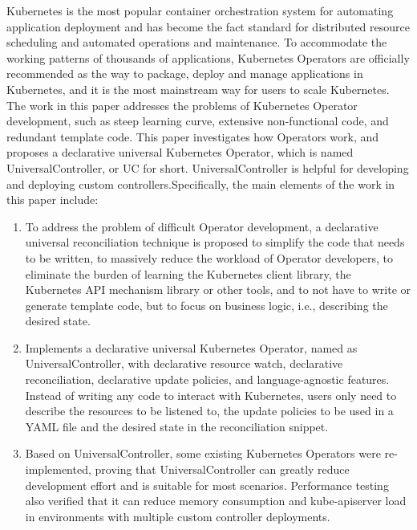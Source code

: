 \documentclass[macfonts,master]{njuthesis}
\begin{document}
\begin{englishabstract}
Kubernetes is the most popular container orchestration system for automating application deployment and has become the fact standard for distributed resource scheduling and automated operations and maintenance. To accommodate the working patterns of thousands of applications, Kubernetes Operators are officially recommended as the way to package, deploy and manage applications in Kubernetes, and it is the most mainstream way for users to scale Kubernetes. The work in this paper addresses the problems of Kubernetes Operator development, such as steep learning curve, extensive non-functional code, and redundant template code. This paper investigates how Operators work, and proposes a declarative universal Kubernetes Operator, which is named UniversalController, or UC for short. UniversalController is helpful for developing and deploying custom controllers.Specifically, the main elements of the work in this paper include:

\begin{enumerate}
	\item To address the problem of difficult Operator development, a declarative universal reconciliation technique is proposed to simplify the code that needs to be written, to massively reduce the workload of Operator developers, to eliminate the burden of learning the Kubernetes client library, the Kubernetes API mechanism library or other tools, and to not have to write or generate template code, but to focus on business logic, i.e., describing the desired state.
	\item Implements a declarative universal Kubernetes Operator, named as UniversalController, with declarative resource watch, declarative reconciliation, declarative update policies, and language-agnostic features. Instead of writing any code to interact with Kubernetes, users only need to describe the resources to be listened to, the update policies to be used in a YAML file and the desired state in the reconciliation snippet.
	\item Based on UniversalController, some existing Kubernetes Operators were re-implemented, proving that UniversalController can greatly reduce development effort and is suitable for most scenarios. Performance testing also verified that it can reduce memory consumption and kube-apiserver load in environments with multiple custom controller deployments.
\end{enumerate}

\end{englishabstract}
\end{document}
